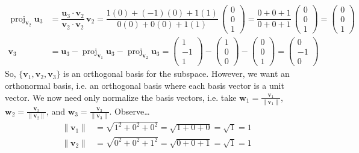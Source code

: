 \documentclass[12pt,letterpaper]{exam}
\begin{document}
\begin{questions}
{\[\begin{aligned}
	\operatorname{proj}_{\mathbf{v}_2} \mathbf{u}_3&= \dfrac{\mathbf{u}_3 \cdot \mathbf{v}_2}{\mathbf{v}_2 \cdot \mathbf{v}_2} \,\mathbf{v}_2= \dfrac{1(0) + (-1)(0) + 1(1)}{0(0) + 0(0) + 1(1)} \, \begin{pmatrix} 0 \\ 0 \\ 1 \end{pmatrix}= \dfrac{0 + 0 + 1}{0 + 0 + 1} \, \begin{pmatrix} 0 \\ 0 \\ 1 \end{pmatrix} = \begin{pmatrix} 0 \\ 0 \\ 1 \end{pmatrix} \\
	\mathbf{v}_3&= \mathbf{u}_3 - \operatorname{proj}_{\mathbf{v}_1} \mathbf{u}_3 - \operatorname{proj}_{\mathbf{v}_2} \mathbf{u}_3= \begin{pmatrix} 1 \\ -1 \\ 1 \end{pmatrix} - \begin{pmatrix} 1 \\ 0 \\ 0 \end{pmatrix} - \begin{pmatrix} 0 \\ 0 \\ 1 \end{pmatrix}= \boxed{\begin{pmatrix} 0 \\ -1 \\ 0 \end{pmatrix}}
	\end{aligned}
	\]
So, $\{ \mathbf{v}_1, \mathbf{v}_2, \mathbf{v}_3 \}$ is an orthogonal basis for the subspace. However, we want an orthonormal basis, i.e. an orthogonal basis where each basis vector is a unit vector. We now need only normalize the basis vectors, i.e. take $\mathbf{w}_1= \frac{\mathbf{v}_1}{\|\mathbf{v}_1\|}$, $\mathbf{w}_2= \frac{\mathbf{v}_2}{\|\mathbf{v}_2\|}$, and $\mathbf{w}_3= \frac{\mathbf{v}_3}{\|\mathbf{v}_3\|}$. Observe\dots
	\[
	\begin{aligned}
	\| \mathbf{v}_1 \|&= \sqrt{1^2 + 0^2 + 0^2}= \sqrt{1 + 0 + 0}= \sqrt{1}= 1 \\
	\| \mathbf{v}_2 \|&= \sqrt{0^2 + 0^2 + 1^2}= \sqrt{0 + 0 + 1}= \sqrt{1}= 1 \\

\end{aligned}\]}
\end{questions}
\end{document}
